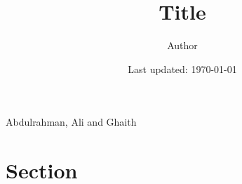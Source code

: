 \documentclass{article}
\title{Title}
\author{Author}
\date{Last updated: \today}
\begin{document}
Abdulrahman, Ali and Ghaith
\maketitle

\section{Section}
\end{document}
